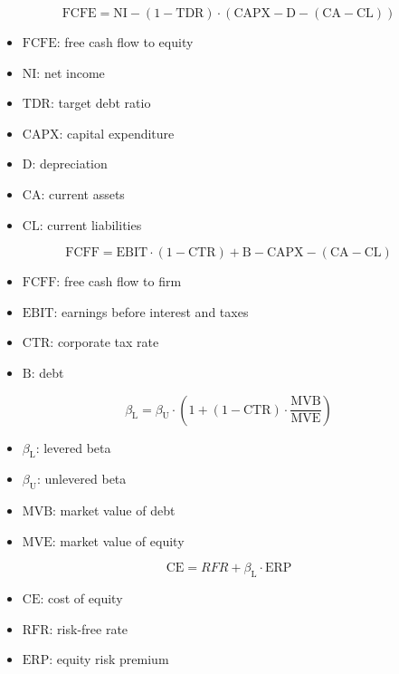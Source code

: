 $$
\text{FCFE} = \text{NI} - (1 - \text{TDR}) \cdot (\text{CAPX} - \text{D} - (\text{CA} - \text{CL}))
$$

\begin{itemize}
  \item[] $\text{FCFE}$: free cash flow to equity
  \item[] $\text{NI}$: net income
  \item[] $\text{TDR}$: target debt ratio
  \item[] $\text{CAPX}$: capital expenditure
  \item[] $\text{D}$: depreciation
  \item[] $\text{CA}$: current assets
  \item[] $\text{CL}$: current liabilities
\end{itemize}

$$
\text{FCFF} = \text{EBIT} \cdot (1 - \text{CTR}) + \text{B} - \text{CAPX} - (\text{CA} - \text{CL}) 
$$

\begin{itemize}
  \item[] $\text{FCFF}$: free cash flow to firm
  \item[] $\text{EBIT}$: earnings before interest and taxes
  \item[] $\text{CTR}$: corporate tax rate
  \item[] $\text{B}$: debt
\end{itemize}

$$
\beta_{\text{L}} = \beta_{\text{U}} \cdot \left(1 + (1 - \text{CTR}) \cdot \frac{\text{MVB}}{\text{MVE}}\right)
$$

\begin{itemize}
  \item[] $\beta_{\text{L}}$: levered beta
  \item[] $\beta_{\text{U}}$: unlevered beta
  \item[] $\text{MVB}$: market value of debt
  \item[] $\text{MVE}$: market value of equity
\end{itemize}

$$
\text{CE} = RFR + \beta_{\text{L}} \cdot \text{ERP}
$$

\begin{itemize}
  \item[] $\text{CE}$: cost of equity
  \item[] $\text{RFR}$: risk-free rate
  \item[] $\text{ERP}$: equity risk premium
\end{itemize}

